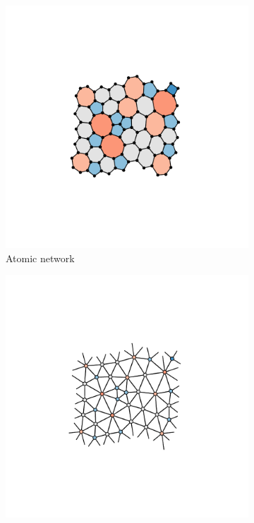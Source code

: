 \begin{figure}[bt]
     \centering
     
     \begin{subfigure}[b]{0.3\textwidth}
         \centering
         \includegraphics[width=\textwidth]{./figures/methods/graph.pdf}
         \caption{Atomic network}
         \label{fig:graphdualgraph}
     \end{subfigure}
     \hfill
	\begin{subfigure}[b]{0.3\textwidth}
         \centering
         \includegraphics[width=\textwidth]{./figures/methods/dual.pdf}

\end{subfigure}
\end{figure}
